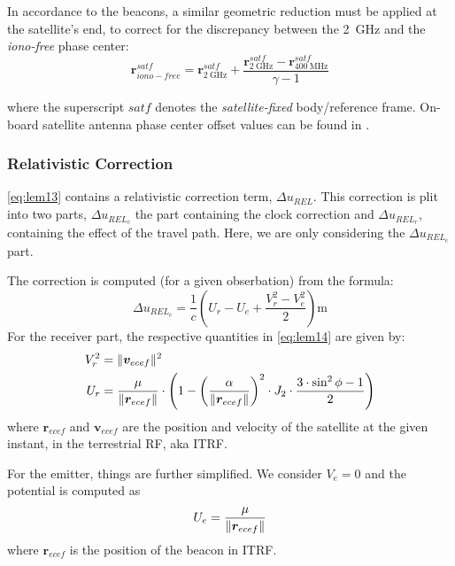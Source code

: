 In accordance to the beacons, a similar geometric reduction must be applied 
at the satellite's end, to correct for the discrepancy between the \SI{2}{\GHz} 
and the \emph{iono-free} phase center:
\begin{equation}
  \bm{r}^{satf}_{iono-free} = \bm{r}^{satf}_{\SI{2}{\GHz}} + 
    \frac{\bm{r}^{satf}_{\SI{2}{\GHz}} - 
    \bm{r}^{satf}_{\SI{400}{\MHz}}}{\gamma - 1}
\end{equation}

where the superscript $satf$ denotes the \emph{satellite-fixed} body/reference 
frame. On-board satellite antenna phase center offset values can be found in 
\cite{DorisSatModels}.

\subsubsection{Relativistic Correction}
\label{sssec:relativistic-correction}
\ref{eq:lem13} contains a relativistic correction term, $\Delta u_{REL}$. This 
correction is plit into two parts, $\Delta u_{REL_c}$ the part containing the 
clock correction and $\Delta u_{REL_r}$, containing the effect of the travel 
path. Here, we are only considering the $\Delta u_{REL_c}$ part.

The correction is computed (for a given obserbation) from the formula:
\begin{equation}
  \Delta u_{REL_c} = \frac{1}{c} \left( U_r - U_e + \frac{V^2_r - V^2_e}{2} \right) \si{\m}
  \label{eq:lem14}
\end{equation}
For the receiver part, the respective quantities in \ref{eq:lem14} are given by:
\begin{equation}
  \begin{aligned}
    V^2_r &= \lVert\bm{v}_{ecef}\rVert^2 \\
    U_r   &= \frac{\mu}{\lVert\bm{r}_{ecef}\rVert} \cdot \left( 1 - 
      \left(\frac{\alpha}{\lVert\bm{r}_{ecef}\rVert}\right) ^2 \cdot J_2 \cdot
        \frac{3 \cdot \sin ^2{\phi} -1}{2} \right)
  \end{aligned}
  \label{eq:potential-receiver}
\end{equation}
where $\bm{r}_{ecef}$ and $\bm{v}_{ecef}$ are the position and velocity of the 
satellite at the given instant, in the terrestrial RF, aka ITRF.

For the emitter, things are further simplified. We consider $V_e = 0$ and the 
potential is computed as 
\begin{equation}
  U_e = \frac{\mu}{\lVert\bm{r}_{ecef}\rVert}
  \label{eq:potential-emitter}
\end{equation}
where $\bm{r}_{ecef}$ is the position of the beacon in ITRF.

